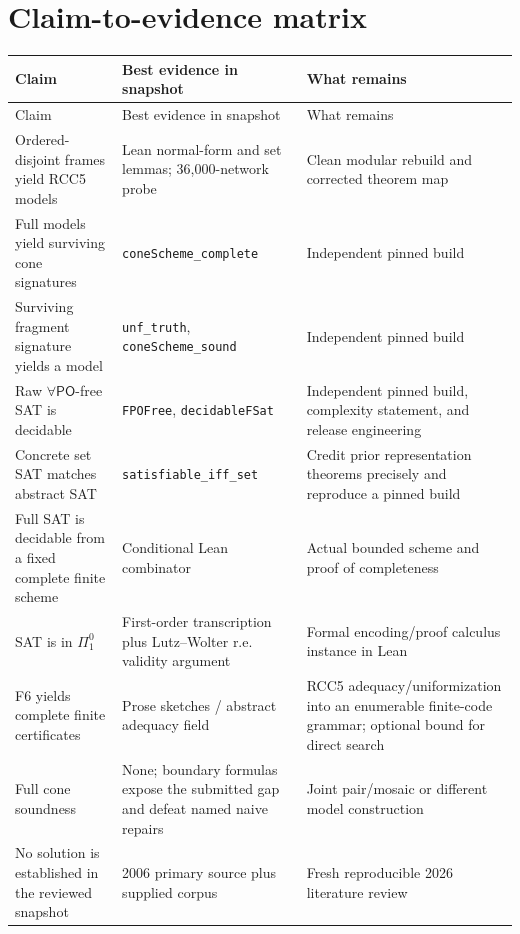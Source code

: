 \documentclass[11pt]{article}
\newcommand{\PO}{\ensuremath{\mathsf{PO}}}
\newcommand{\code}[1]{\texttt{#1}}
\begin{document}
\section{Claim-to-evidence matrix}

\begin{longtable}{L{0.34\textwidth}L{0.24\textwidth}L{0.34\textwidth}}
\toprule
Claim & Best evidence in snapshot & What remains \\
\midrule
\endfirsthead
\toprule
Claim & Best evidence in snapshot & What remains \\
\midrule
\endhead
Ordered-disjoint frames yield RCC5 models & Lean normal-form and set lemmas;
36,000-network probe & Clean modular rebuild and corrected theorem map \\
Full models yield surviving cone signatures & \code{coneScheme\_complete} &
Independent pinned build \\
Surviving fragment signature yields a model & \code{unf\_truth},
\code{coneScheme\_sound} & Independent pinned build \\
Raw \(\forall\PO\)-free SAT is decidable & \code{FPOFree},
\code{decidableFSat} & Independent pinned build, complexity statement, and
release engineering \\
Concrete set SAT matches abstract SAT & \code{satisfiable\_iff\_set} & Credit
prior representation theorems precisely and reproduce a pinned build \\
Full SAT is decidable from a fixed complete finite scheme & Conditional Lean
combinator & Actual bounded scheme and proof of completeness \\
SAT is in \(\Pi^0_1\) & First-order transcription plus Lutz--Wolter r.e.
validity argument & Formal encoding/proof calculus instance in Lean \\
F6 yields complete finite certificates & Prose sketches / abstract adequacy
field & RCC5 adequacy/uniformization into an enumerable finite-code grammar;
optional bound for direct search \\
Full cone soundness & None; boundary formulas expose the submitted gap and
defeat named naive repairs & Joint pair/mosaic or different model construction \\
No solution is established in the reviewed snapshot & 2006 primary source plus
supplied corpus & Fresh reproducible 2026 literature review \\
\bottomrule
\end{longtable}
\end{document}
